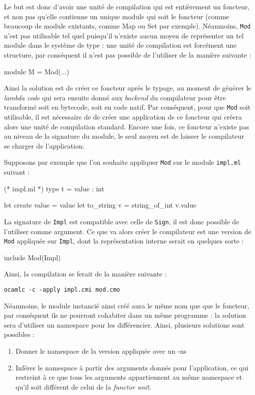 \documentclass[11pt,a4paper]{report}
\begin{document}
Le but est donc d'avoir une unité de compilation qui est entièrement un
foncteur, et non pas qu'elle contienne un unique module qui soit le foncteur
(comme beaucoup de module existants, comme Map ou Set par exemple). Néanmoins,
\texttt{Mod} n'est pas utilisable tel quel puisqu'il n'existe aucun moyen de
représenter un tel module dans le système de type : une unité de compilation est
forcément une structure, par conséquent il n'est pas possible de l'utiliser de
la manière suivante :
\begin{OCaml}
module M = Mod(...)
\end{OCaml}
Ainsi la solution est de créer ce foncteur après le typage, au moment de générer
le \emph{lambda code} qui sera ensuite donné aux \emph{backend} du compilateur
pour être transformé soit en bytecode, soit en code natif. Par conséquent, pour
que \texttt{Mod} soit utilisable, il est nécessaire de de créer une application
de ce foncteur qui créera alors une unité de compilation standard.  Encore une
fois, ce foncteur n'existe pas au niveau de la signature du module, le seul
moyen est de laisser le compilateur se charger de l'application.

Supposons par exemple que l'on souhaite appliquer \texttt{Mod} sur le module
\texttt{impl.ml} suivant :
\begin{OCaml}
(* impl.ml *)
type t = { value : int }

let create value = { value }
let to_string v = string_of_int v.value
\end{OCaml}

La signature de \texttt{Impl} est compatible avec celle de \texttt{Sign}, il est
donc possible de l'utiliser comme argument. Ce que va alors créer le compilateur
est une version de \texttt{Mod} appliquée sur \texttt{Impl}, dont la
représentation interne serait en quelques sorte :
\begin{OCaml}
include Mod(Impl)
\end{OCaml}

Ainsi, la compilation se ferait de la manière suivante :
\begin{verbatim}
ocamlc -c -apply impl.cmi mod.cmo
\end{verbatim}
Néanmoins, le module instancié ainsi créé aura le même nom que que le foncteur,
par conséquent ils ne pourront cohabiter dans un même programme : la solution
sera d'utiliser un namespace pour les différencier. Ainsi, plusieurs solutions
sont possibles :
\begin{enumerate}
\item Donner le namespace de la version appliquée avec un -ns
\item Inférer le namespace à partir des arguments donnés pour l'application, ce
  qui restreint à ce que tous les arguments appartiennent au même namespace et
  qu'il soit différent de celui de la \emph{functor unit}.  
\end{enumerate}
\end{document}
